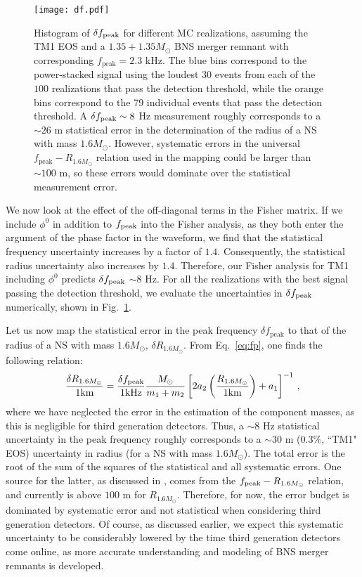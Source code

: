 \documentclass[prd,aps,floatfix,superscriptaddress,nofootinbib,twocolumn,10pt,English]{revtex4-1}
\begin{document}
\begin{figure}[tb]
\texttt{[image: df.pdf]}
\caption{ Histogram of $\delta f_{\rm peak}$ for different MC
  realizations, assuming the TM1 EOS and a $1.35+1.35 M_\odot$ BNS merger remnant with
  corresponding $f_\mathrm{peak} = 2.3$ kHz. The blue bins
  correspond to the power-stacked signal using the loudest 30 events from
  each of the $100$ realizations that pass the detection threshold, while the orange bins correspond to the
  79 individual events that pass the detection threshold.  A $\delta
  f_{\rm peak} \sim 8$ Hz measurement roughly corresponds to a $\sim
  26$ m statistical error in the determination of the radius of a NS
  with mass $1.6M_\odot$. However,
  systematic errors in the universal $f_\mathrm{peak} -
    R_{1.6M_\odot}$ relation used in the mapping could be larger than
  $\sim 100$ m, so these errors would dominate over the statistical 
  measurement error. }
\label{fig:df}
\end{figure}

We now look at the effect of the off-diagonal terms in the Fisher matrix.
If we include $\phi^0$ in addition
to $f_{\rm peak}$ into the Fisher analysis, as they both
enter the argument of the phase factor in the waveform, we find that the statistical
frequency uncertainty increases by a factor of $1.4$. Consequently,
the statistical radius uncertainty also increases by
$1.4$. Therefore, our Fisher analysis for TM1 including $\phi^0$ predicts $\delta f_{\rm
  peak}$ $\sim 8$ Hz.
For all the realizations with the best
signal passing the detection threshold, we evaluate the uncertainties
in $\delta f_{\rm peak}$ numerically, shown in
Fig.~\ref{fig:df}. 
  
Let us now map the statistical error in the peak frequency $\delta
f_\mathrm{peak}$ to that of the radius of a NS with mass $1.6 M_\odot$,
$\delta R_{1.6 M_\odot}$. From Eq.~\eqref{eq:fp}, one finds the
following relation:
\begin{equation}
\label{eq:deltaR}
\frac{\delta R_{1.6 M_\odot}}{1\mathrm{km}} = \frac{\delta f_\mathrm{peak}}{1\mathrm{kHz}} \frac{M_\odot}{m_1+m_2} \left [2 a_2 \left(\frac{R_{1.6 M_\odot}}{1 {\rm km}} \right) +a_1 \right ]^{-1}\,,
\end{equation}
where we have neglected the error in the estimation of the component
masses, as this is negligible for third generation detectors. Thus, a
$\sim 8$ Hz statistical uncertainty in the peak frequency roughly
corresponds to a $\sim 30$ m ($0.3\%$, ``TM1" EOS) uncertainty in
radius (for a NS with mass $1.6 M_\odot$). The total error
is the root of the sum of the squares of the statistical 
and all systematic errors. One source for the latter, as
discussed in \cite{clark2016observing}, comes from the $f_{\rm peak} -
R_{1.6 M_\odot}$ relation, and currently is above
$100$ m for $R_{1.6 M_\odot}$. Therefore, for now, the error budget is
dominated by systematic error and not statistical when considering
third generation detectors.  Of course, as discussed earlier, we
expect this systematic uncertainty to be considerably lowered by the time third
generation detectors come online, as more accurate understanding and
modeling of BNS merger remnants is developed.
  
\end{document}
